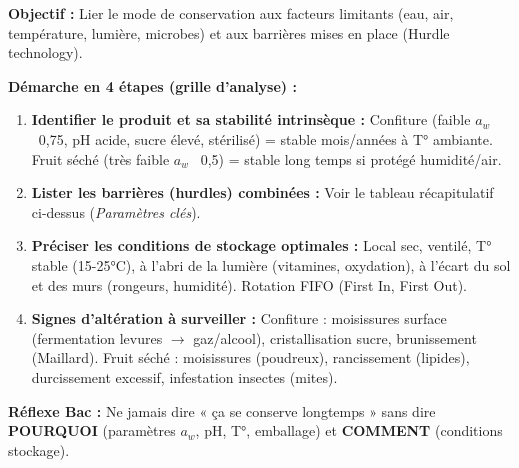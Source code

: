 \documentclass[11pt]{article}
\begin{document}
\begin{methode}
\textbf{Objectif :} Lier le mode de conservation aux facteurs limitants (eau, air, température, lumière, microbes) et aux barrières mises en place (Hurdle technology).\par
\textbf{Démarche en 4 étapes (grille d'analyse) :}
\begin{enumerate}
    \item \textbf{Identifier le produit et sa stabilité intrinsèque :} Confiture (faible $a_w$ ~0,75, pH acide, sucre élevé, stérilisé) = stable mois/années à T° ambiante. Fruit séché (très faible $a_w$ ~0,5) = stable long temps si protégé humidité/air.
    \item \textbf{Lister les barrières (hurdles) combinées :} Voir le tableau récapitulatif ci-dessus (\emph{Paramètres clés}).
    \item \textbf{Préciser les conditions de stockage optimales :} Local sec, ventilé, T° stable (15-25°C), à l'abri de la lumière (vitamines, oxydation), à l'écart du sol et des murs (rongeurs, humidité). Rotation FIFO (First In, First Out).
    \item \textbf{Signes d'altération à surveiller :} Confiture : moisissures surface (fermentation levures $\rightarrow$ gaz/alcool), cristallisation sucre, brunissement (Maillard). Fruit séché : moisissures (poudreux), rancissement (lipides), durcissement excessif, infestation insectes (mites).
\end{enumerate}
\textbf{Réflexe Bac :} Ne jamais dire « ça se conserve longtemps » sans dire \textbf{POURQUOI} (paramètres $a_w$, pH, T°, emballage) et \textbf{COMMENT} (conditions stockage).
\end{methode}
\end{document}
